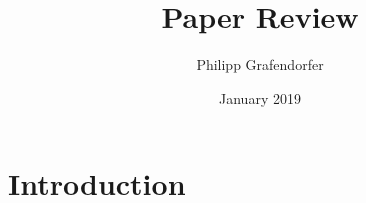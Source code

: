 \documentclass{article}
\title{Paper Review}
\author{Philipp Grafendorfer}
\date{January 2019}
\begin{document}
\maketitle

\section{Introduction}
\end{document}
